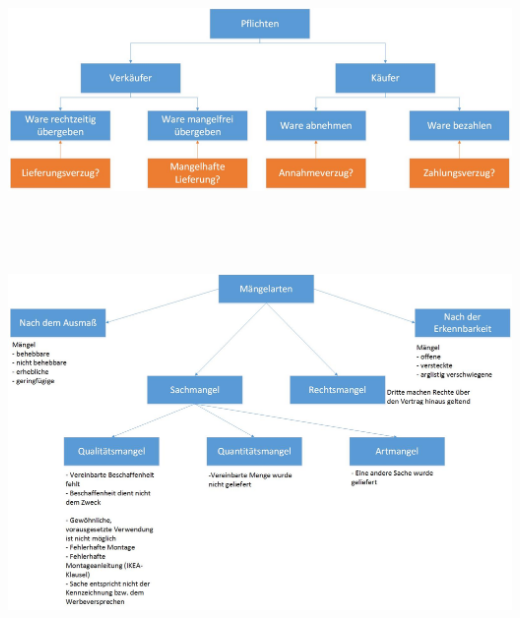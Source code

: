 \includegraphics[scale=0.4]{pictures/lf01-pic/lf01-pflichten-kaufvertrag.jpg}\\
\\ \\ \\ \\
\includegraphics[scale=0.4]{pictures/lf01-pic/lf01-maengelarten.jpg}\\

